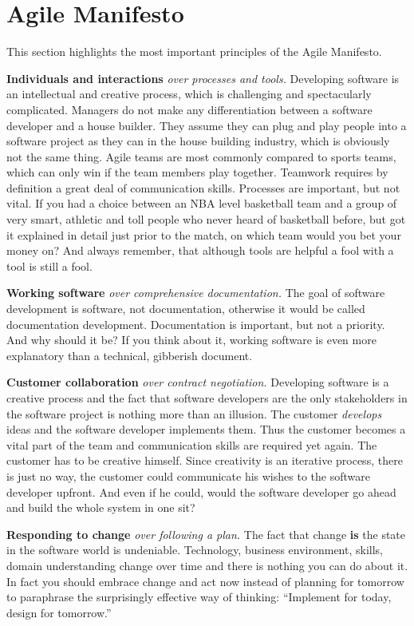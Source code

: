 \section{Agile Manifesto}
This section highlights the most important principles of the Agile
Manifesto.

{\bf Individuals and interactions} \emph{over processes and
tools.}\cite{AgileManifesto} Developing software is an intellectual and creative
process, which is challenging and spectacularly complicated. Managers do not
make any differentiation between a software developer and a house builder. They
assume they can plug and play people into a software project as they can in the
house building industry, which is obviously not the same thing. Agile teams are
most commonly compared to sports teams, which can only win if the team members
play together. Teamwork requires by definition a great deal of communication
skills. Processes are important, but not vital. If you had a choice between an
NBA level basketball team and a group of very smart, athletic and toll people
who never heard of basketball before, but got it explained in detail just prior
to the match, on which team would you bet your money on? And always remember,
that although tools are helpful a fool with a tool is still a fool.

{\bf Working software} \emph{over comprehensive
documentation.}\cite{AgileManifesto} The goal of software development is
software, not documentation, otherwise it would be called documentation
development.\cite{Ambler200204} Documentation is important, but not a priority.
And why should it be? If you think about it, working software is even more
explanatory than a technical, gibberish document.

{\bf Customer collaboration} \emph{over contract
negotiation.}\cite{AgileManifesto} Developing software is a creative process and
the fact that software developers are the only stakeholders in the software
project is nothing more than an illusion. The customer \emph{develops} ideas and
the software developer implements them. Thus the customer becomes a vital part
of the team and communication skills are required yet again. The customer has to
be creative himself. Since creativity is an iterative process, there is just no
way, the customer could communicate his wishes to the software developer
upfront. And even if he could, would the software developer go ahead and build
the whole system in one sit?

{\bf Responding to change} \emph{over following a plan.}\cite{AgileManifesto}
The fact that change {\bf is} the state in the software world is undeniable.
Technology, business environment, skills, domain understanding change over time
and there is nothing you can do about it. In fact you should embrace change and
act now instead of planning for tomorrow to paraphrase the surprisingly
effective way of thinking: \enquote{Implement for today, design for
tomorrow.}\cite{BeckAndres200411}

